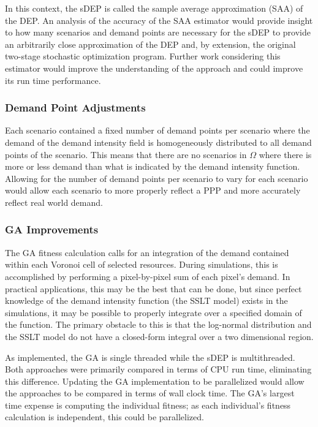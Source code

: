 \documentclass[12pt,dvipsnames]{report}
\begin{document}
In this context, the sDEP is called the sample average approximation (SAA) of the DEP.  An analysis of the accuracy of the SAA estimator would provide insight to how many scenarios and demand points are necessary for the sDEP to provide an arbitrarily close approximation of the DEP and, by extension, the original two-stage stochastic optimization program.  Further work considering this estimator would improve the understanding of the approach and could improve its run time performance.

\subsubsection{Demand Point Adjustments}

Each scenario contained a fixed number of demand points per scenario where the demand of the demand intensity field is homogeneously distributed to all demand points of the scenario.  This means that there are no scenarios in $\Omega$ where there is more or less demand than what is indicated by the demand intensity function.  Allowing for the number of demand points per scenario to vary for each scenario would allow each scenario to more properly reflect a PPP and more accurately reflect real world demand.

\subsubsection{GA Improvements}

The GA fitness calculation calls for an integration of the demand contained within each Voronoi cell of selected resources.  During simulations, this is accomplished by performing a pixel-by-pixel sum of each pixel's demand.  In practical applications, this may be the best that can be done, but since perfect knowledge of the demand intensity function (the SSLT model) exists in the simulations, it may be possible to properly integrate over a specified domain of the function.  The primary obstacle to this is that the log-normal distribution and the SSLT model do not have a closed-form integral over a two dimensional region.

As implemented, the GA is single threaded while the sDEP is multithreaded.  Both approaches were primarily compared in terms of CPU run time, eliminating this difference.  Updating the GA implementation to be parallelized would allow the approaches to be compared in terms of wall clock time.  The GA's largest time expense is computing the individual fitness; as each individual's fitness calculation is independent, this could be parallelized.
\end{document}
